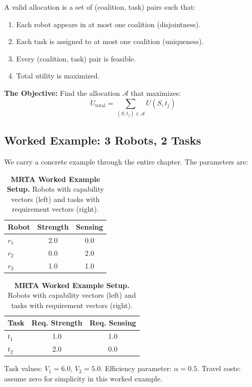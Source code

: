 \begin{definition}
A valid allocation is a set of (coalition, task) pairs such that:
\begin{enumerate}
\item Each robot appears in at most one coalition (disjointness).
\item Each task is assigned to at most one coalition (uniqueness).
\item Every (coalition, task) pair is feasible.
\item Total utility is maximized.
\end{enumerate}
\end{definition}

\textbf{The Objective:} Find the allocation $\mathcal{A}$ that maximizes:
\[
\boxed{U_{\text{total}} = \sum_{(S, t_j) \in \mathcal{A}} U(S, t_j)}
\]

\subsection{Worked Example: 3 Robots, 2 Tasks}
\label{sec:worked-example-setup}

We carry a concrete example through the entire chapter. The parameters are:

\begin{table}[H]
\centering
\begin{tabular}{lcc}
\toprule
\textbf{Robot} & \textbf{Strength} & \textbf{Sensing} \\
\midrule
$r_1$ & 2.0 & 0.0 \\
$r_2$ & 0.0 & 2.0 \\
$r_3$ & 1.0 & 1.0 \\
\bottomrule
\end{tabular}
\quad
\begin{tabular}{lcc}
\toprule
\textbf{Task} & \textbf{Req. Strength} & \textbf{Req. Sensing} \\
\midrule
$t_1$ & 1.0 & 1.0 \\
$t_2$ & 2.0 & 0.0 \\
\bottomrule
\end{tabular}
\caption{\textbf{MRTA Worked Example Setup.} Robots with capability vectors (left) and tasks with requirement vectors (right).}
\label{tab:mrta-setup}
\end{table}

Task values: $V_1 = 6.0$, $V_2 = 5.0$. Efficiency parameter: $\alpha = 0.5$. Travel costs: assume zero for simplicity in this worked example.

